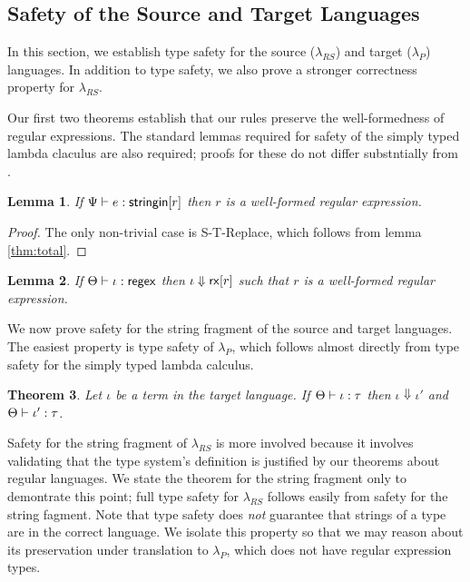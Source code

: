\documentclass[9pt]{sig-alternate}
\newtheorem{thm}{Theorem}
\newtheorem{lem}[thm]{Lemma}
\theoremstyle{definition}
\newcommand{\lambdas}{\lambda_{RS}}
\newcommand{\lambdap}{\lambda_P}
\newcommand{\stringin}[1]{{\sf stringin}[#1]}
\newcommand{\rx}[1]{ {\sf rx}[#1] }
\newcommand{\regex}{{\sf regex}}
\newcommand{\lsubst}[3]{{\tt subst}(#1;#2;#3)} %
\newcommand{\treduces}{ \Downarrow }
\newcommand{\sreduces}{ \Downarrow }
\begin{document}







\subsection{Safety of the Source and Target Languages}

In this section, we establish type safety for the source ($\lambdas$) and
target ($\lambdap$) languages. In addition to type safety, we also prove
a stronger correctness property for $\lambdas$.

Our first two theorems establish that our rules preserve the well-formedness of
regular expressions. The standard lemmas required for safety of the simply
typed lambda claculus are also required; proofs for these do not differ substntially
from \cite{pfpl}.

\begin{lem}
  If $\sctx \vdash e : \stringin{r}$ then $r$ is a well-formed regular expression.
\end{lem}
\begin{proof}
  The only non-trivial case is S-T-Replace, which follows from lemma \ref{thm:total}. 
\end{proof}
\begin{lem}
If $\tctx \vdash \iota : \regex$ then $\iota \treduces \rx{r}$ such that $r$ is a well-formed regular expression. 
\end{lem}

We now prove safety for the string fragment of the source and target languages.
The easiest property is type safety of $\lambdap$, which follows almost directly from
type safety for the simply typed lambda calculus.

\begin{thm} 
  Let $\iota$ be a term in the target language. If $\Theta \vdash \iota : \tau$ 
  then $\iota \sreduces \iota'$ and $\Theta \vdash \iota' : \tau$.
\end{thm}

Safety for the string fragment of $\lambdas$ is more involved because it involves validating that
the type system's definition is justified by our theorems about regular languages.
We state the theorem for the string fragment only to demontrate this point;
full type safety for $\lambdas$ follows easily from safety for the string fagment.
Note that type safety does \emph{not} guarantee that strings of a type are in the
correct language. We isolate this property so that we may reason about its preservation
under translation to $\lambdap$, which does not have regular expression types.
\end{document}

